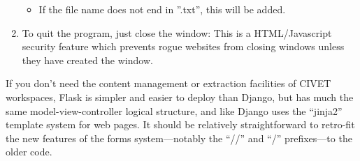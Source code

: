 \documentclass[letterpaper,10pt,english]{sphinxmanual}
\begin{document}
\begin{enumerate}
\begin{itemize}
\item {} 
If the file name does not end in ''.txt'', this will be
added.

\end{itemize}

\item {} 
To quit the program, just close the window: This is a HTML/Javascript security feature which
prevents rogue websites from closing windows unless they have created
the window.

\end{enumerate}

If you don't need the content management or extraction facilities of CIVET
workspaces, Flask is simpler and easier to deploy than Django, but has much
the same model-view-controller logical structure, and like Django uses the
“jinja2” template system for web pages. It should be relatively
straightforward to retro-fit the new features of the forms system—notably
the “//” and “/” prefixes—to the older code.



\renewcommand{\indexname}{Index}
\printindex
\end{document}
